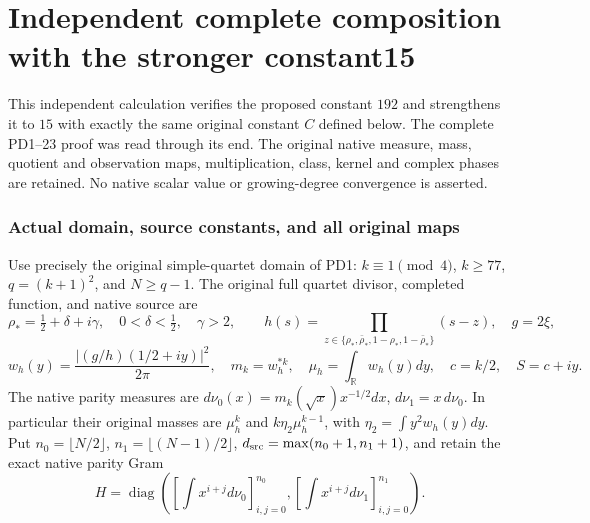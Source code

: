 \endgroup

\clearpage\begingroup
\part*{Independent complete composition with the stronger constant15}
\newcommand{\mcindC}{\mathbb C}
\newcommand{\mcindtr}{\operatorname{tr}}
\newcommand{\mcinddiag}{\operatorname{diag}}
\newcommand{\mcindnorm}[1]{\left\lVert#1\right\rVert}


This independent calculation verifies the proposed constant $192$
and strengthens it to $15$ with exactly the same original constant
$C$ defined below. The complete PD1--23 proof \cite{mcind:PD} was read
through its end. The original native measure, mass, quotient and
observation maps, multiplication, class, kernel and complex phases
are retained. No native scalar value or growing-degree convergence
is asserted.

\section{Actual domain, source constants, and all original maps}

Use precisely the original simple-quartet domain of PD1:
$k\equiv1\pmod4$, $k\ge77$, $q=(k+1)^2$, and $N\ge q-1$.
The original full quartet divisor, completed function, and native
source are
\[
 \rho_*=\tfrac12+\delta+i\gamma,\quad0<\delta<\tfrac12,\quad\gamma>2,
 \qquad
 h(s)=\prod_{z\in\{\rho_*,\bar\rho_*,1-\rho_*,1-\bar\rho_*\}}(s-z),
 \quad g=2\xi,
\]
\[
 w_h(y)=\frac{|(g/h)(1/2+iy)|^2}{2\pi},\quad m_k=w_h^{*k},
 \quad \mu_h=\int_{\mathbb R}w_h(y)dy,\quad c=k/2,\quad S=c+iy.
\]
The native parity measures are
$d\nu_0(x)=m_k(\sqrt x)x^{-1/2}dx$, $d\nu_1=x\,d\nu_0$.
In particular their original masses are $\mu_h^k$ and
$k\eta_2\mu_h^{k-1}$, with $\eta_2=\int y^2w_h(y)dy$.
Put $n_0=\lfloor N/2\rfloor$, $n_1=\lfloor(N-1)/2\rfloor$,
$d_{\rm src}=\max(n_0+1,n_1+1)$, and retain the exact native
parity Gram
\begin{equation}\tag{MC1}\label{mcind:eq:H}
 H=\mcinddiag\left([\int x^{i+j}d\nu_0]_{i,j=0}^{n_0},
               [\int x^{i+j}d\nu_1]_{i,j=0}^{n_1}\right).
\end{equation}

